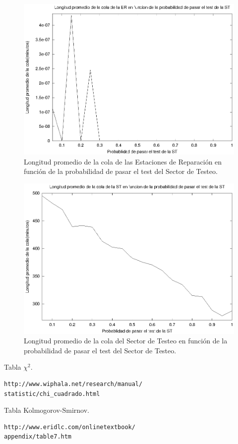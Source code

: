 \documentclass[a4paper,10pt]{article}
\begin{document}
\begin{figure}[ht]
\begin{center}
\includegraphics[width=15cm]{./img/ql_ER.eps}
\caption{\label{fig:ql_ER} Longitud promedio de la cola de las Estaciones de Reparaci\'on en funci\'on de la probabilidad de pasar el test del Sector de Testeo.}
\end{center}
\end{figure}

\begin{figure}[ht]
\begin{center}
\includegraphics[width=15cm]{./img/ql_ST.eps}
\caption{\label{fig:ql_ST} Longitud promedio de la cola del Sector de Testeo en funci\'on de la probabilidad de pasar el test del Sector de Testeo.}
\end{center}
\end{figure}

\begin{thebibliography}{10}
 Tabla $\chi^{2}$.
\begin{verbatim}
http://www.wiphala.net/research/manual/
statistic/chi_cuadrado.html
\end{verbatim}
 Tabla Kolmogorov-Smirnov.
\begin{verbatim}
http://www.eridlc.com/onlinetextbook/
appendix/table7.htm
\end{verbatim}
\end{thebibliography}
\end{document}

